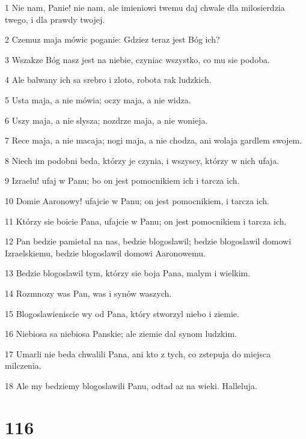 \par 1 Nie nam, Panie! nie nam, ale imieniowi twemu daj chwale dla milosierdzia twego, i dla prawdy twojej.
\par 2 Czemuz maja mówic poganie: Gdziez teraz jest Bóg ich?
\par 3 Wszakze Bóg nasz jest na niebie, czyniac wszystko, co mu sie podoba.
\par 4 Ale balwany ich sa srebro i zloto, robota rak ludzkich.
\par 5 Usta maja, a nie mówia; oczy maja, a nie widza.
\par 6 Uszy maja, a nie slysza; nozdrze maja, a nie wonieja.
\par 7 Rece maja, a nie macaja; nogi maja, a nie chodza, ani wolaja gardlem swojem.
\par 8 Niech im podobni beda, którzy je czynia, i wszyscy, którzy w nich ufaja.
\par 9 Izraelu! ufaj w Panu; bo on jest pomocnikiem ich i tarcza ich.
\par 10 Domie Aaronowy! ufajcie w Panu; on jest pomocnikiem, i tarcza ich.
\par 11 Którzy sie boicie Pana, ufajcie w Panu; on jest pomocnikiem i tarcza ich.
\par 12 Pan bedzie pamietal na nas, bedzie blogoslawil; bedzie blogoslawil domowi Izraelskiemu, bedzie blogoslawil domowi Aaronowemu.
\par 13 Bedzie blogoslawil tym, którzy sie boja Pana, malym i wielkim.
\par 14 Rozmnozy was Pan, was i synów waszych.
\par 15 Blogoslawieniscie wy od Pana, który stworzyl niebo i ziemie.
\par 16 Niebiosa sa niebiosa Panskie; ale ziemie dal synom ludzkim.
\par 17 Umarli nie beda chwalili Pana, ani kto z tych, co zstepuja do miejsca milczenia.
\par 18 Ale my bedziemy blogoslawili Panu, odtad az na wieki. Halleluja.

\chapter{116}

